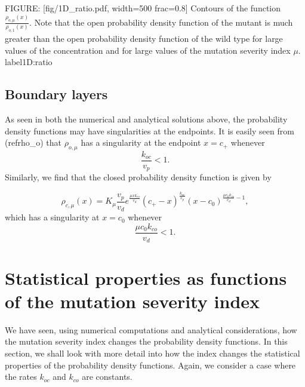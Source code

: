 FIGURE: [fig/1D_ratio.pdf, width=500 frac=0.8] Contours of the function $\frac{\rho_{o,\mu}(x)}{\rho_{o,1}(x)}$. Note that the open probability density function
of the mutant is much greater than the open probability density function
of the wild type for large values of the concentration and for large values of the mutation severity index $\mu$. label{1D:ratio}\subsection{Boundary layers}

As seen in both the numerical and analytical solutions above, the probability
density functions may have singularities at the endpoints. It is easily seen
from (ref{rho_o}) that $\rho_{o,\mu}$ has a singularity at
the endpoint $x=c_{+}$ whenever
\[
\frac{k_{oc}}{v_{p}}<1.
\]
Similarly, we find that the closed probability density function is given by



\[
\rho_{c,\mu}(x)=K_{\mu}\frac{v_{p}}{v_{d}}e^{\frac{\mu xk_{co}}{v_{d}}}
(c_{+}-x)^{\frac{k_{oc}}{v_{p}}}(x-c_{0})^{\frac{\mu c_{0}k_{co}}{v_{d}}-1},
\]
which has a singularity at $x=c_{0}$ whenever
\[
\frac{\mu c_{0}k_{co}}{v_{d}}<1.
\]


\bigskip

\section[Statistical properties of the mutation]{Statistical properties as functions of the mutation severity index}

We have seen, using numerical computations and analytical considerations, how
the mutation severity index changes the probability density functions. In this
section, we shall look with more detail into how the index changes the
statistical properties of the probability density functions. Again, we consider a case where
the rates $k_{oc}$ and  $k_{co}$ are constants.



